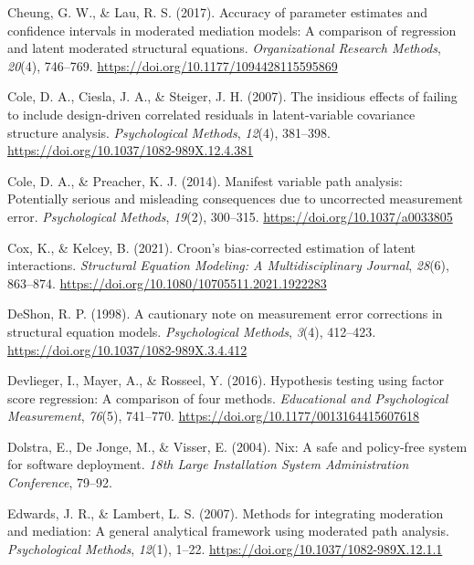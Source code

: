 \documentclass[
  man,
  longtable,
  nolmodern,
  notxfonts,
  notimes,
  colorlinks=true,linkcolor=blue,citecolor=blue,urlcolor=blue]{apa7}
\newlength{\cslhangindent}
\newenvironment{CSLReferences}[2] %
 {\begin{list}{}{%
  \setlength{\itemindent}{0pt}
  \setlength{\leftmargin}{0pt}
  \setlength{\parsep}{0pt}
  \ifodd #1
   \setlength{\leftmargin}{\cslhangindent}
   \setlength{\itemindent}{-1\cslhangindent}
  \fi
  \setlength{\itemsep}{#2\baselineskip}}}
 {\end{list}}
\begin{document}
\begin{CSLReferences}{1}{0}
Cheung, G. W., \& Lau, R. S. (2017). Accuracy of parameter estimates and
confidence intervals in moderated mediation models: A comparison of
regression and latent moderated structural equations.
\emph{Organizational Research Methods}, \emph{20}(4), 746--769.
\url{https://doi.org/10.1177/1094428115595869}

Cole, D. A., Ciesla, J. A., \& Steiger, J. H. (2007). The insidious
effects of failing to include design-driven correlated residuals in
latent-variable covariance structure analysis. \emph{Psychological
Methods}, \emph{12}(4), 381--398.
\url{https://doi.org/10.1037/1082-989X.12.4.381}

Cole, D. A., \& Preacher, K. J. (2014). Manifest variable path analysis:
Potentially serious and misleading consequences due to uncorrected
measurement error. \emph{Psychological Methods}, \emph{19}(2), 300--315.
\url{https://doi.org/10.1037/a0033805}

Cox, K., \& Kelcey, B. (2021). {Croon}'s bias-corrected estimation of
latent interactions. \emph{Structural Equation Modeling: A
Multidisciplinary Journal}, \emph{28}(6), 863--874.
\url{https://doi.org/10.1080/10705511.2021.1922283}

DeShon, R. P. (1998). A cautionary note on measurement error corrections
in structural equation models. \emph{Psychological Methods},
\emph{3}(4), 412--423. \url{https://doi.org/10.1037/1082-989X.3.4.412}

Devlieger, I., Mayer, A., \& Rosseel, Y. (2016). Hypothesis testing
using factor score regression: A comparison of four methods.
\emph{Educational and Psychological Measurement}, \emph{76}(5),
741--770. \url{https://doi.org/10.1177/0013164415607618}

Dolstra, E., De Jonge, M., \& Visser, E. (2004). {Nix}: A safe and
policy-free system for software deployment. \emph{18th Large
Installation System Administration Conference}, 79--92.

Edwards, J. R., \& Lambert, L. S. (2007). Methods for integrating
moderation and mediation: A general analytical framework using moderated
path analysis. \emph{Psychological Methods}, \emph{12}(1), 1--22.
\url{https://doi.org/10.1037/1082-989X.12.1.1}


\end{CSLReferences}
\end{document}
